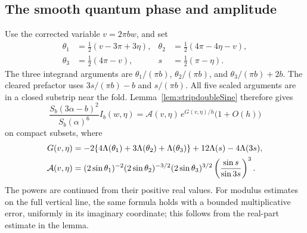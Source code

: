 \subsection{The smooth quantum phase and amplitude}

Use the corrected variable $v=2\pi bw$, and set
\begin{equation}
 \begin{aligned}
 \theta_1&=\tfrac12(v-3\pi+3\eta),&
 \theta_2&=\tfrac12(4\pi-4\eta-v),\\
 \theta_3&=\tfrac12(4\pi-v),&
 s&=\tfrac12(\pi-\eta).
 \end{aligned}
 \label{eq:regularstripangles}
\end{equation}
The three integrand arguments are
$\theta_1/(\pi b)$, $\theta_2/(\pi b)$, and
$\theta_3/(\pi b)+2b$.
The cleared prefactor uses $3s/(\pi b)-b$ and $s/(\pi b)$.
All five scaled arguments are in a closed substrip near the fold.
Lemma~\ref{lem:stripdoubleSine} therefore gives
\begin{equation}
 \frac{S_b(3\alpha-b)^2}{S_b(\alpha)^6}I_b(w,\eta)
 =
 \mathcal A(v,\eta)\,e^{G(v,\eta)/h}
 \bigl(1+O(h)\bigr)
 \label{eq:fullsmoothquantumphase}
\end{equation}
on compact subsets, where
\begin{align}
 G(v,\eta)
 &=-2\{4\Lambda(\theta_1)+3\Lambda(\theta_2)
                              +\Lambda(\theta_3)\}
        +12\Lambda(s)-4\Lambda(3s),\notag\\
 \mathcal A(v,\eta)
 &=(2\sin\theta_1)^{-2}(2\sin\theta_2)^{-3/2}
   (2\sin\theta_3)^{3/2}
   \left(\frac{\sin s}{\sin3s}\right)^3.
 \label{eq:clearedphaseamplitude}
\end{align}
The powers are continued from their positive real values.
For modulus estimates on the full vertical line, the same formula
holds with a bounded multiplicative error, uniformly in its
imaginary coordinate; this follows from the real-part estimate
in the lemma.

